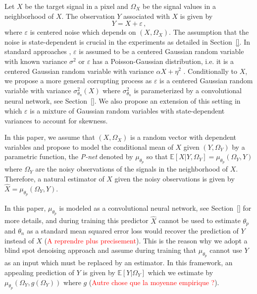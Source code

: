 \documentclass{article}
\begin{document}
Let $X$ be the target signal in a pixel and $\Omega_X$ be the signal values in a neighborhood of $X$.  The observation $Y$ associated with $X$  is given by
\begin{equation}
\label{eq:def:Y}
Y = X + \varepsilon\,,
\end{equation}
where $\varepsilon$ is centered noise which depends on $(X,\Omega_X)$. The assumption that the noise is state-dependent is crucial in the experiments as detailed in Section~\ref{}. In standard approaches \cite{},  $\varepsilon$ is assumed to be a centered Gaussian random variable with known variance $\sigma^2$ \cite{} or $\varepsilon$ has a Poisson-Gaussian distribution, i.e. it  is a centered Gaussian random variable with variance $\alpha X + \eta^2$ \cite{}.
Conditionally to $X$, we propose a more general corrupting process as $\varepsilon$ is a centered Gaussian random variable with variance $\sigma^2_{\theta_n}(X)$ where $\sigma^2_{\theta_n}$ is parameterized by a convolutional neural network, see Section~\ref{}. We also propose an extension of this setting in which $\varepsilon$ is a mixture of Gaussian random variables with state-dependent variances to account for skewness.

In this paper, we assume that $(X,\Omega_X)$ is a random vector with dependent variables and propose to model the conditional mean of $X$ given $(Y,\Omega_Y)$ by a parametric function, the {\em P-net} denoted by $\mu_{\theta_p}$ so that $\mathbb{E}[X|Y,\Omega_Y] = \mu_{\theta_p}(\Omega_Y,Y)$ where $\Omega_Y$ are the noisy observations of the signals in the neighborhood of $X$. Therefore, a natural estimator of $X$ given the noisy observations is given by $\widehat X = \mu_{\theta_p}(\Omega_Y,Y)$.

In this paper, $\mu_{\theta_p}$ is modeled as a convolutional neural network, see Section~\ref{} for more details, and during training this predictor $\widehat X$ cannot be used to estimate $\theta_p$ and $\theta_n$ as  a standard mean squared error loss would recover the prediction of $Y$ instead of $X$ (\textcolor{red}{A reprendre plus precisement}). This is the reason why we adopt a blind spot denoising approach and assume during training that $\mu_{\theta_p}$ cannot use $Y$ as an input which must be replaced by an estimator. In this framework, an appealing prediction of $Y$ is given by $\mathbb{E}[Y|\Omega_Y]$ which we estimate by $\mu_{\theta_p}(\Omega_Y,g(\Omega_Y))$ where $g$ (\textcolor{red}{Autre chose que la moyenne empirique ?}).
\end{document}
